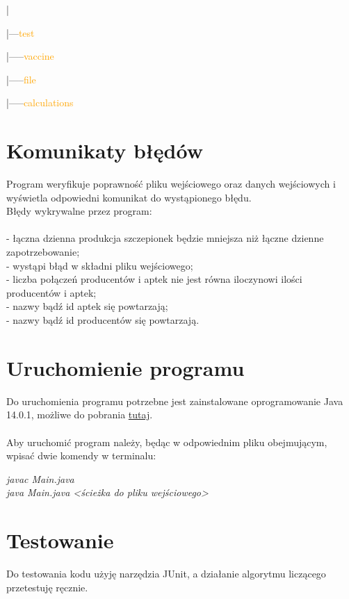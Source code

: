 \documentclass[]{article}
\begin{document}
	|
	
	|---\textcolor{orange}{test}
	
	\hspace{5mm} |-----\textcolor{orange}{vaccine} 

	\hspace{16mm}|-----\textcolor{orange}{file}
	
	\hspace{16mm}|-----\textcolor{orange}{calculations}

\clearpage

\section{Komunikaty błędów}
Program weryfikuje poprawność pliku wejściowego oraz danych wejściowych i wyświetla odpowiedni komunikat do wystąpionego błędu. \\ Błędy wykrywalne przez program:\\\\
- łączna dzienna produkcja szczepionek będzie mniejsza niż łączne dzienne zapotrzebowanie;\\
- wystąpi błąd w składni pliku wejściowego;\\
- liczba połączeń producentów i aptek nie jest równa iloczynowi ilości producentów i aptek;\\
- nazwy bądź id aptek się powtarzają;\\
- nazwy bądź id producentów się powtarzają.\\

\section{Uruchomienie programu}
Do uruchomienia programu potrzebne jest zainstalowane oprogramowanie Java 14.0.1, możliwe do pobrania \href{https://jdk.java.net/archive/}{tutaj}.\\\\
Aby uruchomić program należy, będąc w odpowiednim pliku obejmującym, wpisać dwie komendy w terminalu:\\
\begin{center}
\textit{javac Main.java\\
java Main.java <ścieżka do pliku wejściowego>}

\end{center}

\section{Testowanie}
Do testowania kodu użyję narzędzia JUnit, a działanie algorytmu liczącego przetestuję ręcznie.
\end{document}

